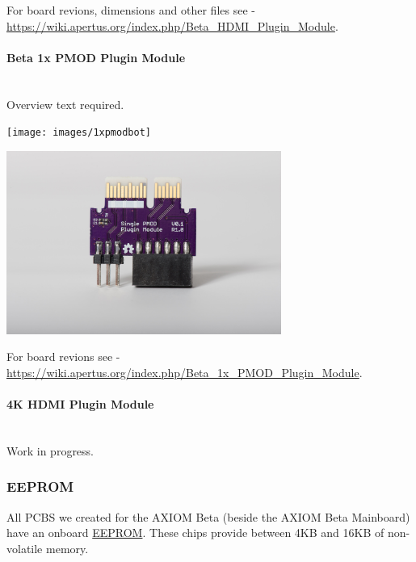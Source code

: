 For board revions, dimensions and other files see - \href{https://wiki.apertus.org/index.php/Beta_HDMI_Plugin_Module}{https://wiki.apertus.org/index.php/Beta\_HDMI\_Plugin\_Module}.\\


\paragraph{Beta 1x PMOD Plugin Module }\mbox{}\\

Overview text required.\\

\begin{center}
\texttt{[image: images/1xpmodbot]}
\end{center}

\begin{center}
\includegraphics[height=6cm]{images/1xpmodtop}
\end{center}


For board revions see - \href{https://wiki.apertus.org/index.php/Beta_1x_PMOD_Plugin_Module}{https://wiki.apertus.org/index.php/Beta\_1x\_PMOD\_Plugin\_Module}.\\



\paragraph{4K HDMI Plugin Module}\mbox{}\\

Work in progress.

\subsubsection{EEPROM}

All PCBS we created for the AXIOM Beta (beside the AXIOM Beta Mainboard) have an onboard \href{https://en.wikipedia.org/wiki/EEPROM}{EEPROM}. These chips provide between 4KB and 16KB of non-volatile memory.\\

